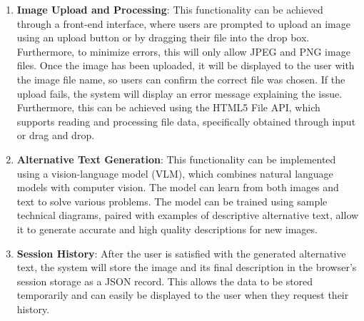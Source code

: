 \documentclass[12pt]{article}
\begin{document}
\begin{enumerate}
  \item \textbf{Image Upload and Processing}:
  This functionality can be achieved through a front-end interface,
  where users are prompted to upload an image using an upload button or
  by dragging their file into the drop box. Furthermore, to minimize
  errors, this will only allow JPEG and PNG image files.
  Once the image has been uploaded, it will be displayed to the user
  with the image file name, so users can confirm the correct file was chosen.
  If the upload fails, the system will display an error message
  explaining the issue. Furthermore, this can be achieved using the
  HTML5 File API, which supports reading and processing file data,
  specifically obtained through input or drag and drop. 
  \item 
  \textbf{Alternative Text Generation}:
  This functionality can be implemented using a vision-language model
  (VLM), which combines natural language models with computer vision.
  The model can learn from both images and text to solve various
  problems. The model can be trained using sample technical diagrams,
  paired with examples of descriptive alternative text, allow it to
  generate accurate and high quality descriptions for new images.
  \item 
  \textbf{Session History}:
  After the user is satisfied with the generated alternative text, the system will store the image and its final description in the browser's session storage as a JSON record. This allows the data to be stored temporarily and can easily be displayed to the user when they request their history.   
\end{enumerate}

\newpage
\end{document}
